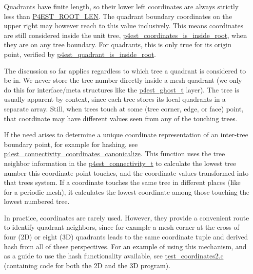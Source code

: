 Quadrants have finite length, so their lower left coordinates are always strictly less than \mbox{\hyperlink{p4est_8h_ae26167f0411d9845caa84be6d50c0cee}{P4\+EST\+\_\+\+ROOT\+\_\+\+LEN}}. The quadrant boundary coordinates on the upper right may however reach to this value inclusively. This means coordinates are still considered inside the unit tree, \mbox{\hyperlink{p4est__bits_8h_a718799d86f590417fab1ccba78c6b3b8}{p4est\+\_\+coordinates\+\_\+is\+\_\+inside\+\_\+root}}, when they are on any tree boundary. For quadrants, this is only true for its origin point, verified by \mbox{\hyperlink{p4est__bits_8h_ab8f88e83d54ea09df2a0d5da476f25e0}{p4est\+\_\+quadrant\+\_\+is\+\_\+inside\+\_\+root}}.

The discussion so far applies regardless to which tree a quadrant is considered to be in. We never store the tree number directly inside a mesh quadrant (we only do this for interface/meta structures like the \mbox{\hyperlink{structp4est__ghost__t}{p4est\+\_\+ghost\+\_\+t}} layer). The tree is usually apparent by context, since each tree stores its local quadrants in a separate array. Still, when trees touch at some (tree corner, edge, or face) point, that coordinate may have different values seen from any of the touching trees.

If the need arises to determine a unique coordinate representation of an inter-\/tree boundary point, for example for hashing, see \mbox{\hyperlink{p4est__connectivity_8h_a35a4816ff10305a61d0e749ec9888a6d}{p4est\+\_\+connectivity\+\_\+coordinates\+\_\+canonicalize}}. This function uses the tree neighbor information in the \mbox{\hyperlink{p4est__connectivity_8h_a7bfc76825a73a3764b063ef476ed62f3}{p4est\+\_\+connectivity\+\_\+t}} to calculate the lowest tree number this coordinate point touches, and the coordinate values transformed into that tree\textquotesingle{}s system. If a coordinate touches the same tree in different places (like for a periodic mesh), it calculates the lowest coordinate among those touching the lowest numbered tree.

In practice, coordinates are rarely used. However, they provide a convenient route to identify quadrant neighbors, since for example a mesh corner at the cross of four (2D) or eight (3D) quadrants leads to the same coordinate tuple and derived hash from all of these perspectives. For an example of using this mechanism, and as a guide to use the hash functionality available, see \mbox{\hyperlink{test_coordinates2_8c-example}{test\+\_\+coordinates2.\+c}} (containing code for both the 2D and the 3D program). 